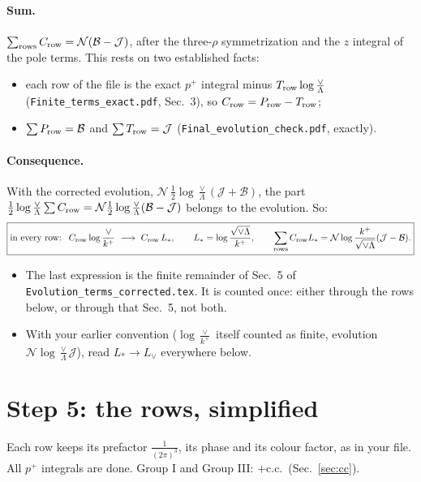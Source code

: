 \documentclass[10pt]{article}
\numberwithin{equation}{section}
\newcommand{\Lv}{L_{\vee}}
\newcommand{\Ls}{L_{*}}
\newcommand{\JJ}{\mathcal J}
\newcommand{\BB}{\mathcal B}
\newcommand{\NN}{\mathcal N}
\newcommand{\pre}{\frac{1}{(2\pi)^3}}
\begin{document}
\paragraph{Sum.} $\sum_{\rm rows}C_{\rm row}=\NN(\BB-\JJ)$, after the three-$\rho$ symmetrization and the $z$ integral of the pole terms. This rests on two established facts:
\begin{itemize}
\item each row of the file is the exact $p^+$ integral minus $T_{\rm row}\log\frac{\vee}{\Lambda}$ (\texttt{Finite\_terms\_exact.pdf}, Sec.~3), so $C_{\rm row}=P_{\rm row}-T_{\rm row}$;
\item $\sum P_{\rm row}=\BB$ and $\sum T_{\rm row}=\JJ$ (\texttt{Final\_evolution\_check.pdf}, exactly).
\end{itemize}
\paragraph{Consequence.} With the corrected evolution, $\NN\,\frac12\log\frac\vee\Lambda(\JJ+\BB)$, the part $\frac12\log\frac\vee\Lambda\sum C_{\rm row}=\NN\frac12\log\frac\vee\Lambda(\BB-\JJ)$ belongs to the evolution. So:
\begin{equation}
\boxed{\text{in every row: }\ C_{\rm row}\log\frac{\vee}{k^+}\ \longrightarrow\ C_{\rm row}\,\Ls,\qquad \Ls=\log\frac{\sqrt{\vee\Lambda}}{k^+},\qquad\sum_{\rm rows}C_{\rm row}\Ls=\NN\log\frac{k^+}{\sqrt{\vee\Lambda}}(\JJ-\BB).}
\label{eq:Ls}
\end{equation}
\begin{itemize}
\item The last expression is the finite remainder of Sec.~5 of \texttt{Evolution\_terms\_corrected.tex}. It is counted once: either through the rows below, or through that Sec.~5, not both.
\item With your earlier convention ($\log\frac{\vee}{k^+}$ itself counted as finite, evolution $\NN\log\frac\vee\Lambda\JJ$), read $\Ls\to\Lv$ everywhere below.
\end{itemize}

\section{Step 5: the rows, simplified}\label{sec:rows}
Each row keeps its prefactor $\pre$, its phase and its colour factor, as in your file. All $p^+$ integrals are done. Group I and Group III: $+$c.c.\ (Sec.~\ref{sec:cc}).
\end{document}

